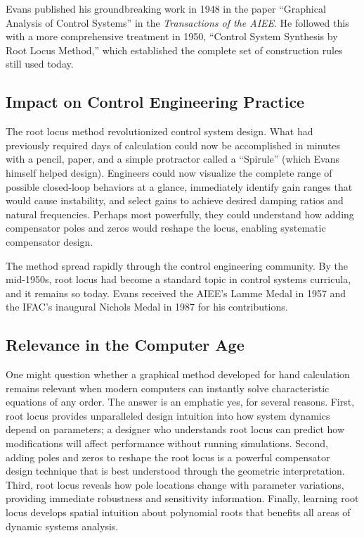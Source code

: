 Evans published his groundbreaking work in 1948 in the paper ``Graphical Analysis of Control Systems'' in the \textit{Transactions of the AIEE}. He followed this with a more comprehensive treatment in 1950, ``Control System Synthesis by Root Locus Method,'' which established the complete set of construction rules still used today.

\subsection{Impact on Control Engineering Practice}

The root locus method revolutionized control system design. What had previously required days of calculation could now be accomplished in minutes with a pencil, paper, and a simple protractor called a ``Spirule'' (which Evans himself helped design). Engineers could now visualize the complete range of possible closed-loop behaviors at a glance, immediately identify gain ranges that would cause instability, and select gains to achieve desired damping ratios and natural frequencies. Perhaps most powerfully, they could understand how adding compensator poles and zeros would reshape the locus, enabling systematic compensator design.

The method spread rapidly through the control engineering community. By the mid-1950s, root locus had become a standard topic in control systems curricula, and it remains so today. Evans received the AIEE's Lamme Medal in 1957 and the IFAC's inaugural Nichols Medal in 1987 for his contributions.

\subsection{Relevance in the Computer Age}

One might question whether a graphical method developed for hand calculation remains relevant when modern computers can instantly solve characteristic equations of any order. The answer is an emphatic yes, for several reasons. First, root locus provides unparalleled design intuition into how system dynamics depend on parameters; a designer who understands root locus can predict how modifications will affect performance without running simulations. Second, adding poles and zeros to reshape the root locus is a powerful compensator design technique that is best understood through the geometric interpretation. Third, root locus reveals how pole locations change with parameter variations, providing immediate robustness and sensitivity information. Finally, learning root locus develops spatial intuition about polynomial roots that benefits all areas of dynamic systems analysis.

